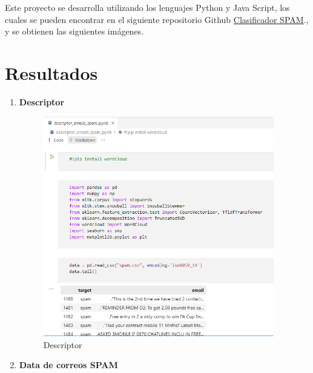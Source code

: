 \documentclass{article}
\begin{document}
  Este proyecto se desarrolla utilizando los lenguajes Python y Java Script, los cuales se pueden encontrar en el siguiente repositorio Github \href{https://github.com/JZegarra100/KNN-JavaScript}{Clasificador SPAM}., y se obtienen las siguientes imágenes.

\section{Resultados}

    \begin{enumerate}
    
        \item \textbf{Descriptor}

\begin{figure}[H]
\centering
\includegraphics[width=0.95\textwidth]{Img/descriptor.png}
\caption{Descriptor}
\end{figure}

\item \textbf{Data de correos SPAM}


\end{enumerate}
\end{document}
